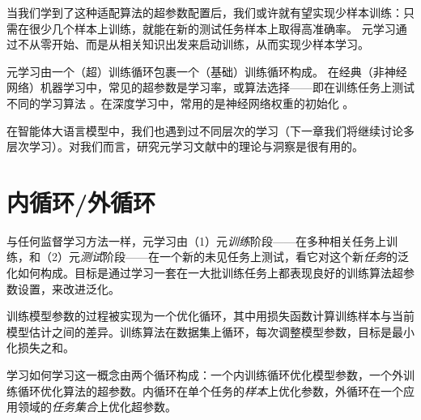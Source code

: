 
当我们学到了这种适配算法的超参数配置后，我们或许就有望实现少样本训练：只需在很少几个样本上训练，就能在新的测试任务样本上取得高准确率。
%
元学习通过不从零开始、而是从相关知识出发来启动训练，从而实现少样本学习。%


元学习由一个（超）训练循环包裹一个（基础）训练循环构成。%
在经典（非神经网络）机器学习中，常见的超参数是学习率，或算法选择——即在训练任务上测试不同的学习算法 \citep{brazdil2022metalearning}。在深度学习中，常用的是神经网络权重的初始化 \citep{finn2017model}。

在智能体大语言模型中，我们也遇到过不同层次的学习（下一章我们将继续讨论多层次学习）。对我们而言，研究元学习文献中的理论与洞察是很有用的。





\section{内循环/外循环}

与任何监督学习方法一样，元学习由（1）元{\em 训练}阶段——在多种相关任务上训练，和（2）元{\em 测试}阶段——在一个新的未见任务上测试，看它对这个新{\em 任务}的泛化如何构成。目标是通过学习一套在一大批训练任务上都表现良好的训练算法超参数设置，来改进泛化。

训练模型参数的过程被实现为一个优化循环，其中用损失函数计算训练样本与当前模型估计之间的差异。训练算法在数据集上循环，每次调整模型参数，目标是最小化损失之和。

学习如何学习这一概念由两个循环构成：一个内训练循环优化模型参数，一个外训练循环优化算法的超参数。内循环在单个任务的{\em 样本}上优化参数，外循环在一个应用领域的{\em 任务集合}上优化超参数。


